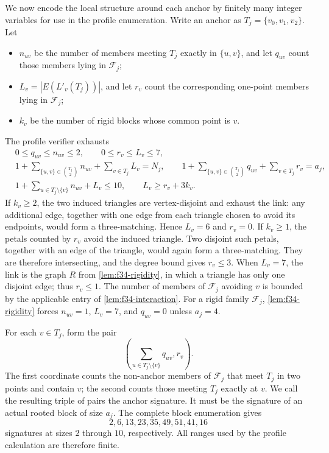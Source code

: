 \documentclass[11pt]{article}
\numberwithin{equation}{section}
\theoremstyle{definition}
\theoremstyle{remark}
\newcommand{\F}{\mathcal F}
\begin{document}
We now encode the local structure around each anchor by finitely many integer
variables for use in the profile enumeration. Write an anchor as
$T_j=\{v_0,v_1,v_2\}$. Let
\begin{itemize}
\item $n_{uv}$ be the number of members meeting $T_j$ exactly in
      $\{u,v\}$, and let $q_{uv}$ count those members lying in $\F_j$;
\item $L_v=|E(L'_v(T_j))|$, and let $r_v$ count the corresponding one-point
      members lying in $\F_j$;
\item $k_v$ be the number of rigid blocks whose common point is $v$.
\end{itemize}
The profile verifier exhausts
\begin{align}
 &0\le q_{uv}\le n_{uv}\le2,
 \qquad 0\le r_v\le L_v\le7,
 \label{eq:f34-local-ranges}\\
 &1+\sum_{\{u,v\}\in\binom{T_j}{2}}n_{uv}
      +\sum_{v\in T_j}L_v=N_j,
 \qquad
 1+\sum_{\{u,v\}\in\binom{T_j}{2}}q_{uv}
      +\sum_{v\in T_j}r_v=a_j,
 \label{eq:f34-local-identities}\\
 &1+\sum_{u\in T_j\setminus\{v\}}n_{uv}+L_v\le10,
 \qquad
 L_v\ge r_v+3k_v.
 \label{eq:f34-local-degree}
\end{align}
If $k_v\ge2$, the two induced triangles are vertex-disjoint and exhaust the
link: any additional edge, together with one edge from each triangle chosen
to avoid its endpoints, would form a three-matching. Hence $L_v=6$ and
$r_v=0$. If $k_v\ge1$, the petals counted by $r_v$ avoid the induced
triangle. Two disjoint such petals, together with an edge of the triangle,
would again form a three-matching. They are therefore intersecting, and the
degree bound gives $r_v\le3$. When $L_v=7$, the link is the graph $R$ from
\cref{lem:f34-rigidity}, in which a triangle has only one disjoint edge; thus
$r_v\le1$. The number of members of $\F_j$ avoiding $v$ is bounded by the
applicable entry of \cref{lem:f34-interaction}. For a rigid family $\F_j$,
\cref{lem:f34-rigidity} forces $n_{uv}=1$, $L_v=7$, and $q_{uv}=0$ unless
$a_j=4$.

For each $v\in T_j$, form the pair
\[
 \left(\sum_{u\in T_j\setminus\{v\}}q_{uv},r_v\right).
\]
The first coordinate counts the non-anchor members of $\F_j$ that meet
$T_j$ in two points and contain $v$; the second counts those meeting $T_j$
exactly at $v$. We call the resulting triple of pairs the anchor signature.
It must be the signature of an actual rooted block of size $a_j$. The
complete block enumeration gives
\[
 2,6,13,23,35,49,51,41,16
\]
signatures at sizes $2$ through $10$, respectively. All ranges used by the
profile calculation are therefore finite.
\end{document}
